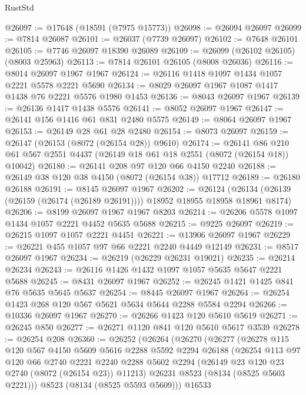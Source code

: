 \begin{lexlean}{RustStd}
\begin{coremodule}
{\begin{coremodule}
{{{{{{{{{{{{{{{{{{{{{{{{{{{{{{{{{{{{{{{{{{{{{{{{{{{{{@26097 := @17648 (@18591 (@7975 @15773))
@26098 := @26094 @26097
@26099 := @7814 @26087
@26101 := @26037 (@7739 @26097)
@26102 := @7648 @26101
@26105 := @7746 @26097 @18390 @26089
@26109 := @26099 (@26102 @26105) (@8003 @25963)
@26113 := @7814 @26101 @26105 (@8008 @26036)
@26116 := @8014 @26097 @1967 @1967
@26124 := @26116 @1418 @1097 @1434 @1057 @2221 @5578 @2221 @5690
@26134 := @8029 @26097 @1967 @1087 @1417 @1438 @76 @2221 @5576 @1980 @1453
@26136 := @8043 @26097 @1967
@26139 := @26136 @1417 @1438 @5576
@26141 := @8052 @26097 @1967
@26147 := @26141 @156 @1416 @61 @831 @2480 @5575
@26149 := @8064 @26097 @1967
@26153 := @26149 @28 @61 @28 @2480
@26154 := @8073 @26097
@26159 := @26147 (@26153 (@8072 (@26154 @28)) @9610)
@26174 := @26141
    @86
    @210
    @61
    @567
    @2551
    @4437
    (@26149 @18 @61 @18 @2551 (@8072 (@26154 @18)) @10042)
@26180 := @26141 @208 @97 @120 @66 @4150 @2240
@26188 := @26149 @38 @120 @38 @4150 (@8072 (@26154 @38)) @17712
@26189 := @26180 @26188
@26191 := @8145 @26097 @1967
@26202 := @26124
    (@26134 (@26139 (@26159 (@26174 (@26189 @26191)))) @18952 @18955 @18958 @18961 @8174)
@26206 := @8199 @26097 @1967 @1967 @8203
@26214 := @26206 @5578 @1097 @1434 @1057 @2221 @4452 @5635 @5688
@26215 := @9225 @26097
@26219 := @26215 @1097 @1057 @2221 @4451
@26221 := @13906 @26097 @1967
@26229 := @26221 @455 @1057 @97 @66 @2221 @2240 @4449 @12149
@26231 := @8517 @26097 @1967
@26234 := @26219 (@26229 @26231 @19021)
@26235 := @26214 @26234
@26243 := @26116 @1426 @1432 @1097 @1057 @5635 @5647 @2221 @5688
@26245 := @8431 @26097 @1967
@26252 := @26245 @1421 @1425 @841 @76 @5635 @5645 @5637
@26254 := @8445 @26097 @1967
@26264 := @26254 @1423 @268 @120 @567 @5621 @5634 @5644 @2288 @5584 @2294
@26266 := @10336 @26097 @1967
@26270 := @26266 @1423 @120 @5610 @5619
@26271 := @26245 @850
@26277 := @26271 @1120 @841 @120 @5610 @5617 @3539
@26278 := @26254 @208
@26360 := @26252
    (@26264
      (@26270
        (@26277
          (@26278
            @115
            @120
            @567
            @4150
            @5609
            @5616
            @2288
            @5592
            @2294
            @26188
            (@26254
              @113
              @97
              @120
              @66
              @2740
              @2221
              @2240
              @2288
              @5602
              @2294
              (@26149 @23 @120 @23 @2740 (@8072 (@26154 @23)) @11213)
              @26231
              @8523
              (@8134 (@8525 @5603 @2221)))
            @8523
            (@8134 (@8525 @5593 @5609)))
          @16533
}}}}}}}}}}}}}}}}}}}}}}}}}}}}}}}}}}}}}}}}}}}}}}}}}}}}}
\end{coremodule}}
\end{coremodule}
\end{lexlean}
